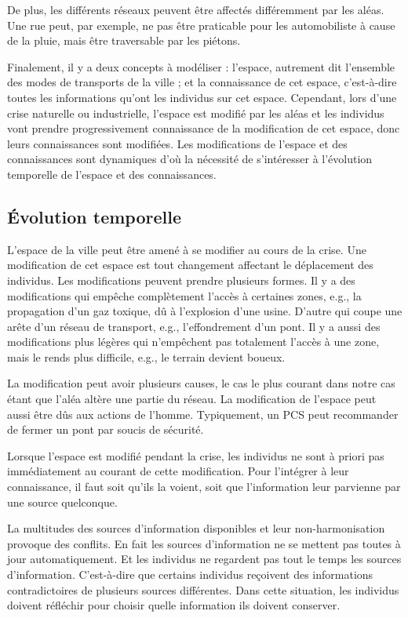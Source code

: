 \documentclass[a4paper]{article}
\begin{document}
De plus, les différents réseaux peuvent être affectés différemment par les
aléas. Une rue peut, par exemple, ne pas être praticable pour les automobiliste
à cause de la pluie, mais être traversable par les piétons.

Finalement, il y a deux concepts à modéliser : l'espace, autrement dit
l'ensemble des modes de transports de la ville ; et la connaissance de cet
espace, c'est-à-dire toutes les informations qu'ont les individus sur cet
espace. Cependant, lors d'une crise naturelle ou industrielle, l'espace est
modifié par les aléas et les individus vont prendre progressivement connaissance
de la modification de cet espace, donc leurs connaissances sont modifiées. Les
modifications de l'espace et des connaissances sont dynamiques d'où la nécessité
de s'intéresser à l'évolution temporelle de l'espace et des connaissances.

\subsection{Évolution temporelle}

L'espace de la ville peut être amené à se modifier au cours de la crise. Une
modification de cet espace est tout changement affectant le déplacement des
individus. Les modifications peuvent prendre plusieurs formes. Il y a des
modifications qui empêche complètement l'accès à certaines zones, e.g., la
propagation d'un gaz toxique, dû à l'explosion d'une usine. D'autre qui coupe
une arête d'un réseau de transport, e.g., l'effondrement d'un pont. Il y a aussi
des modifications plus légères qui n'empêchent pas totalement l'accès à une
zone, mais le rends plus difficile, e.g., le terrain devient boueux.

La modification peut avoir plusieurs causes, le cas le plus courant dans notre
cas étant que l'aléa altère une partie du réseau. La modification de l'espace
peut aussi être dûs aux actions de l'homme. Typiquement, un PCS peut
recommander de fermer un pont par soucis de sécurité.

Lorsque l'espace est modifié pendant la crise, les individus ne sont à priori
pas immédiatement au courant de cette modification. Pour l'intégrer à leur
connaissance, il faut soit qu'ils la voient, soit que l'information leur
parvienne par une source quelconque.

La multitudes des sources d'information disponibles et leur non-harmonisation
provoque des conflits. En fait les sources d'information ne se mettent pas
toutes à jour automatiquement. Et les individus ne regardent pas tout le temps
les sources d'information. C'est-à-dire que certains individus reçoivent des informations
contradictoires de plusieurs sources différentes. Dans cette situation, les
individus doivent réfléchir pour choisir quelle information ils doivent
conserver.
\end{document}
